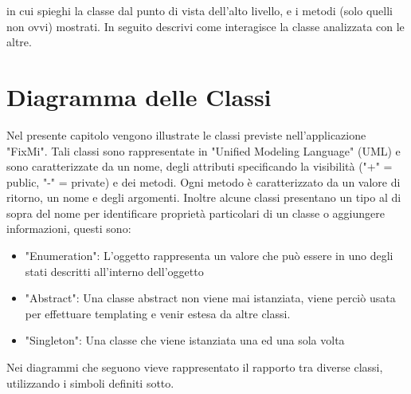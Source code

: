 \documentclass{report}
\begin{document}
in cui spieghi la classe dal punto di vista dell'alto livello, e i metodi (solo quelli non ovvi) mostrati.
In seguito descrivi come interagisce la classe analizzata con le altre.


\fi
	
\chapter{Diagramma delle Classi}

Nel presente capitolo vengono illustrate le classi previste nell'applicazione "FixMi". Tali classi sono rappresentate in "Unified Modeling Language" (UML) e sono caratterizzate da un nome, degli attributi specificando la visibilità ("+" = public, "-" = private) e dei metodi. Ogni metodo è caratterizzato da un valore di ritorno, un nome e degli argomenti. Inoltre alcune classi presentano un tipo al di sopra del nome per identificare proprietà particolari di un classe o aggiungere informazioni, questi sono:
\begin{itemize}
	\item "Enumeration": L'oggetto rappresenta un valore che può essere in uno degli stati descritti all'interno dell'oggetto
	\item "Abstract": Una classe abstract non viene mai istanziata, viene perciò usata per effettuare templating e venir estesa da altre classi.
	\item "Singleton": Una classe che viene istanziata una ed una sola volta
\end{itemize}
Nei diagrammi che seguono vieve rappresentato il rapporto tra diverse classi, utilizzando i simboli definiti sotto.
\end{document}
